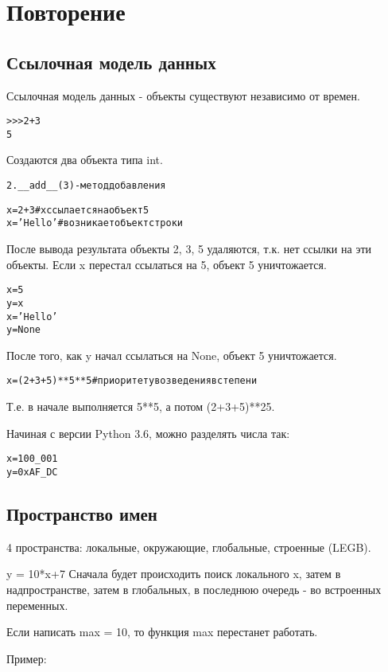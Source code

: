 \chapter{Повторение}
\section{Ссылочная модель данных}
Ссылочная модель данных - объекты существуют независимо от времен.
\begin{alltt}
>>> 2+3
5
\end{alltt}
Создаются два объекта типа int.
\begin{alltt}
2.__add__(3) - метод добавления
\end{alltt}
\begin{alltt}
	x = 2+3 # x ссылается на объект 5
	x = 'Hello' # возникает объект строки
\end{alltt}
После вывода результата объекты 2, 3, 5 удаляются, т.к. нет ссылки на эти объекты.
Если x перестал ссылаться на 5, объект 5 уничтожается.
\begin{alltt}
x = 5
y = x
x = 'Hello'
y = None
\end{alltt}
После того, как y начал ссылаться на None, объект 5 уничтожается.
\begin{alltt}
	x = (2+3+5)**5**5 # приоритет у возведения в степени
\end{alltt}

Т.е. в начале выполняется 5**5, а потом (2+3+5)**25.

Начиная с версии Python 3.6, можно разделять числа так:
\begin{alltt}
x = 100_001
y = 0xAF_DC
\end{alltt}
\section{Пространство имен}
4 пространства: локальные, окружающие, глобальные, строенные (LEGB).

y = 10*x+7
Сначала будет происходить поиск локального x, затем в надпространстве, затем в глобальных, в последнюю очередь - во встроенных переменных.

Если написать 
max = 10,
то функция max перестанет работать.

Пример:

